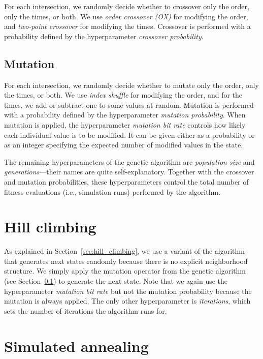For each intersection, we randomly decide whether to crossover only the order, only the times, or both. We use \textit{order crossover (OX)} for modifying the order, and \textit{two-point crossover} for modifying the times. Crossover is performed with a probability defined by the hyperparameter \textit{crossover probability}.

\subsection{Mutation} \label{sec:mutation_application}

For each intersection, we randomly decide whether to mutate only the order, only the times, or both. We use \textit{index shuffle} for modifying the order, and for the times, we add or subtract one to some values at random. Mutation is performed with a probability defined by the hyperparameter \textit{mutation probability}. When mutation is applied, the hyperparameter \textit{mutation bit rate} controls how likely each individual value is to be modified. It can be given either as a probability or as an integer specifying the expected number of modified values in the state.

\bigskip

The remaining hyperparameters of the genetic algorithm are \textit{population size} and \textit{generations}---their names are quite self-explanatory. Together with the crossover and mutation probabilities, these hyperparameters control the total number of fitness evaluations (i.e., simulation runs) performed by the algorithm.

\section{Hill climbing} \label{sec:hill_climbing_application}

As explained in Section~\ref{sec:hill_climbing}, we use a variant of the algorithm that generates next states randomly because there is no explicit neighborhood structure. We simply apply the mutation operator from the genetic algorithm (see Section~\ref{sec:mutation_application}) to generate the next state. Note that we again use the hyperparameter \textit{mutation bit rate} but not the mutation probability because the mutation is always applied. The only other hyperparameter is \textit{iterations}, which sets the number of iterations the algorithm runs for.

\section{Simulated annealing} \label{sec:simulated_annealing_application}

